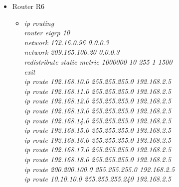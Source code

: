 \documentclass[12pt,a4paper]{report}
\begin{document}
\begin{itemize}
\begin{itemize}
\begin{itemize}
		\end{itemize}
             \item Router R6
        \begin{itemize}
         \item \textit{ip routing\\
router eigrp 10\\
network 172.16.0.96 0.0.0.3\\
network 209.165.100.20 0.0.0.3\\
redistribute static metric 1000000 10 255 1 1500\\
exit\\
ip route 192.168.10.0 255.255.255.0 192.168.2.5\\
ip route 192.168.11.0 255.255.255.0 192.168.2.5\\
ip route 192.168.12.0 255.255.255.0 192.168.2.5\\
ip route 192.168.13.0 255.255.255.0 192.168.2.5\\
ip route 192.168.14.0 255.255.255.0 192.168.2.5\\
ip route 192.168.15.0 255.255.255.0 192.168.2.5\\
ip route 192.168.16.0 255.255.255.0 192.168.2.5\\
ip route 192.168.17.0 255.255.255.0 192.168.2.5\\
ip route 192.168.18.0 255.255.255.0 192.168.2.5\\
ip route 200.200.100.0 255.255.255.0 192.168.2.5\\
ip route 10.10.10.0 255.255.255.240 192.168.2.5\\}
         

\end{itemize}
\end{itemize}
\end{itemize}
\end{document}
